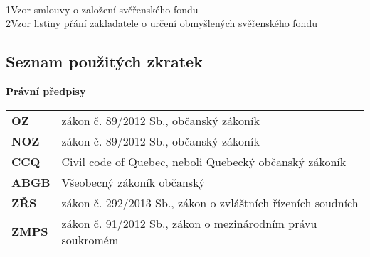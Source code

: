\documentclass{article}
\begin{document}

\newpage
  \thispagestyle{Contents}
  \tableofcontents
  
 \newpage
  \listoffigures


\vspace*{0.5cm}
  
\\

\normalsize{1\hspace*{1.8em}Vzor smlouvy o založení svěřenského fondu}\\
\indent\normalsize{2\hspace*{1.8em}Vzor listiny přání zakladatele o určení obmyšlených svěřenského fondu}


\newpage
 
\begin{center}
\section{Seznam použitých zkratek}
\end{center}

\vspace{5 mm}

\textbf{Právní předpisy}

\vspace{5 mm}

\begin{tabular}{p{3cm}p{8cm}}
\textbf{OZ} & zákon č. 89/2012 Sb., občanský zákoník	 \\
\textbf{NOZ} & zákon č. 89/2012 Sb., občanský zákoník	 \\
\textbf{CCQ} & Civil code of Quebec, neboli Quebecký občanský zákoník \\
\textbf{ABGB} & Všeobecný zákoník občanský	 \\
\textbf{ZŘS} & zákon č. 292/2013 Sb., zákon o zvláštních řízeních soudních	 \\
\textbf{ZMPS} & zákon č. 91/2012 Sb., zákon o mezinárodním právu soukromém	 \\
\end{tabular}
\end{document}
